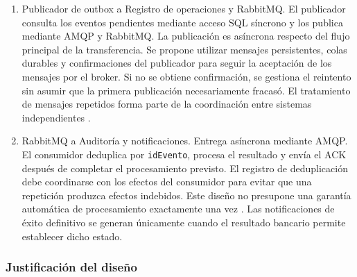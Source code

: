 \documentclass[12pt,a4paper]{article}
\begin{document}
\begin{enumerate}
    \item Publicador de outbox a Registro de operaciones
    y RabbitMQ.
    El publicador consulta los eventos pendientes mediante
    acceso SQL síncrono y los publica mediante AMQP y
    RabbitMQ. La publicación es asíncrona respecto del
    flujo principal de la transferencia. Se propone utilizar
    mensajes persistentes, colas durables y confirmaciones
    del publicador para seguir la aceptación de los mensajes
    por el broker. Si no se obtiene confirmación, se gestiona
    el reintento sin asumir que la primera publicación
    necesariamente fracasó. El tratamiento de mensajes
    repetidos forma parte de la coordinación entre sistemas
    independientes \cite{helland2017}.

    \item RabbitMQ a Auditoría y notificaciones.
    Entrega asíncrona mediante AMQP. El consumidor deduplica
    por \texttt{idEvento}, procesa el resultado y envía
    el ACK después de completar el procesamiento previsto.
    El registro de deduplicación debe coordinarse con los
    efectos del consumidor para evitar que una repetición
    produzca efectos indebidos. Este diseño no presupone
    una garantía automática de procesamiento exactamente
    una vez \cite{helland2017}.
    Las notificaciones de éxito definitivo se generan
    únicamente cuando el resultado bancario permite
    establecer dicho estado.

\end{enumerate}

\subsubsection{Justificación del diseño}
\end{document}
